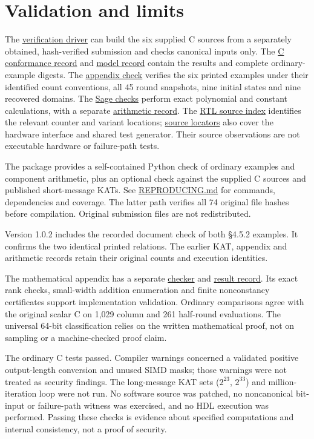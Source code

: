 \documentclass[
  english,
  11pt,
  a4paper,
]{article}
\begin{document}

\section{Validation and limits}\label{validation-and-limits}

The \href{run.py}{verification driver} can build the six supplied C
sources from a separately obtained, hash-verified submission and checks
canonical inputs only. The \href{evidence/c_conformance.json}{C
conformance record} and \href{evidence/quick.json}{model record} contain
the results and complete ordinary-example digests. The
\href{code/check_appendix.py}{appendix check} verifies the six printed
examples under their identified count conventions, all 45 round
snapshots, nine initial states and nine recovered domains. The
\href{code/arithmetic_checks.sage}{Sage checks} perform exact polynomial
and constant calculations, with a separate
\href{evidence/arithmetic.json}{arithmetic record}. The
\href{data/rtl_source_facts.json}{RTL source index} identifies the
relevant counter and variant locations; \href{data/SOURCES.md}{source
locators} also cover the hardware interface and shared test generator.
Their source observations are not executable hardware or failure-path
tests.

The package provides a self-contained Python check of ordinary examples
and component arithmetic, plus an optional check against the supplied C
sources and published short-message KATs. See \url{REPRODUCING.md} for
commands, dependencies and coverage. The latter path verifies all 74
original file hashes before compilation. Original submission files are
not redistributed.

Version 1.0.2 includes the recorded document check of both §4.5.2
examples. It confirms the two identical printed relations. The earlier
KAT, appendix and arithmetic records retain their original counts and
execution identities.

The mathematical appendix has a separate
\href{code/check_subcolumn_structures.py}{checker} and
\href{evidence/subcolumn_structures.json}{result record}. Its exact rank
checks, small-width addition enumeration and finite nonconstancy
certificates support implementation validation. Ordinary comparisons
agree with the original scalar C on 1,029 column and 261 half-round
evaluations. The universal 64-bit classification relies on the written
mathematical proof, not on sampling or a machine-checked proof claim.

The ordinary C tests passed. Compiler warnings concerned a validated
positive output-length conversion and unused SIMD masks; those warnings
were not treated as security findings. The long-message KAT sets
(\(2^{23}\), \(2^{33}\)) and million-iteration loop were not run. No
software source was patched, no noncanonical bit-input or failure-path
witness was exercised, and no HDL execution was performed. Passing these
checks is evidence about specified computations and internal
consistency, not a proof of security.
\end{document}
